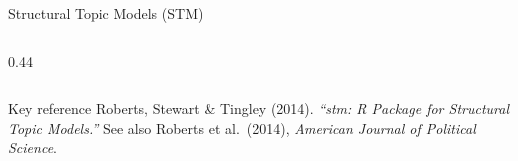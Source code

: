 \documentclass[aspectratio=169]{beamer}
\begin{document}
\begin{frame}{Structural Topic Models (STM)}
\begin{columns}[T]
\begin{column}{0.44\textwidth}
\begin{center}
            \end{center}
        \end{column}
    \end{columns}

    \vspace{0.1cm}
    \begin{exampleblock}{Key reference}
        \footnotesize
        Roberts, Stewart \& Tingley (2014). \textit{``stm: R Package for Structural Topic Models.''}
        See also Roberts et al.\ (2014), \textit{American Journal of Political Science}.
    \end{exampleblock}
\end{frame}
\end{document}
